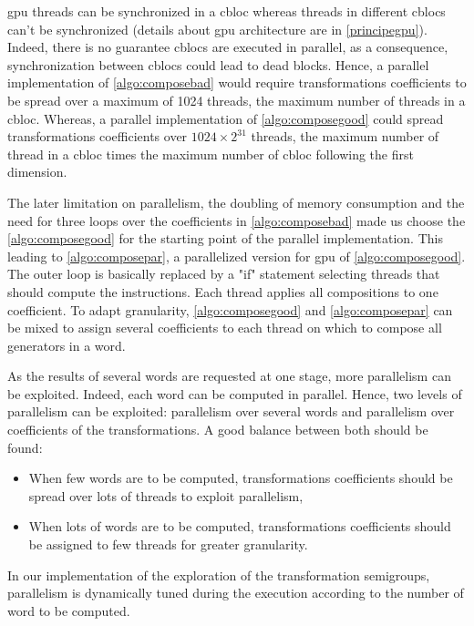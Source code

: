 {\gls{gpu} threads can be synchronized in a \gls{cbloc} whereas threads in different \glspl{cbloc} can't be synchronized \cite{doccuda} 
(details about \gls{gpu} architecture are in \autoref{principegpu}). 
Indeed, there is no guarantee \glspl{cbloc} are executed in parallel, as a consequence, synchronization between \glspl{cbloc} could lead to dead blocks. 
Hence, a parallel implementation of \autoref{algo:composebad} would require transformations coefficients to be spread over a maximum of 1024 threads, 
the maximum number of threads in a \gls{cbloc}.
Whereas, a parallel implementation of \autoref{algo:composegood} could spread transformations coefficients over $1024 \times 2^{31}$ threads, 
the maximum number of thread in a \gls{cbloc} times the maximum number of \gls{cbloc} following the first dimension.

The later limitation on parallelism, the doubling of memory consumption and the need for three loops over the coefficients in \autoref{algo:composebad} 
made us choose the \autoref{algo:composegood} for the starting point of the parallel implementation. This leading to 
\autoref{algo:composepar}, a parallelized version for \gls{gpu} of \autoref{algo:composegood}. 
The outer loop is basically replaced by a "if" statement selecting threads that should compute the instructions. Each thread applies all compositions to one coefficient.
To adapt granularity, \autoref{algo:composegood} and \autoref{algo:composepar} can be mixed to assign several coefficients to each thread on which to compose all generators in a word.

As the results of several words are requested at one stage, more parallelism can be exploited. 
Indeed, each word can be computed in parallel. 
Hence, two levels of parallelism can be exploited: 
parallelism over several words and parallelism over coefficients of the transformations. A good balance between both should be found:
\begin{itemize}
\item When few words are to be computed, transformations coefficients should be spread over lots of threads to exploit parallelism,
\item When lots of words are to be computed, transformations coefficients should be assigned to few threads for greater granularity.
\end{itemize}

In our implementation of the exploration of the transformation semigroups, 
parallelism is dynamically tuned during the execution according to the number of word to be computed.



}
